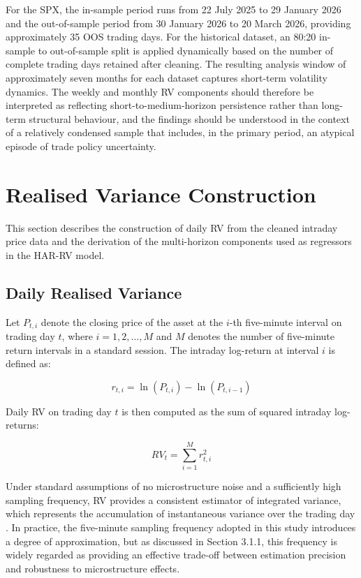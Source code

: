 \documentclass[12pt,a4paper]{report}
\begin{document}
For the SPX, the in-sample period runs from 22 July 2025 to 29 January 2026 and the out-of-sample period from 30 January 2026 to 20 March 2026, providing approximately 35 OOS trading days. For the historical dataset, an 80:20 in-sample to out-of-sample split is applied dynamically based on the number of complete trading days retained after cleaning. The resulting analysis window of approximately seven months for each dataset captures short-term volatility dynamics. The weekly and monthly RV components should therefore be interpreted as reflecting short-to-medium-horizon persistence rather than long-term structural behaviour, and the findings should be understood in the context of a relatively condensed sample that includes, in the primary period, an atypical episode of trade policy uncertainty.

\section{Realised Variance Construction}
This section describes the construction of daily RV from the cleaned intraday price data and the derivation of the multi-horizon components used as regressors in the HAR-RV model.

\subsection{Daily Realised Variance}
Let $P_{t,i}$ denote the closing price of the asset at the $i$-th five-minute interval on trading day $t$, where $i = 1, 2, \ldots, M$ and $M$ denotes the number of five-minute return intervals in a standard session. The intraday log-return at interval $i$ is defined as:

\begin{equation}
r_{t,i} = \ln(P_{t,i}) - \ln(P_{t,i-1})
\end{equation}

\noindent Daily RV on trading day $t$ is then computed as the sum of squared intraday log-returns:

\begin{equation}
RV_t = \sum_{i=1}^{M} r_{t,i}^2
\end{equation}

\noindent Under standard assumptions of no microstructure noise and a sufficiently high sampling frequency, RV provides a consistent estimator of integrated variance, which represents the accumulation of instantaneous variance over the trading day \citep{Andersen1998, BarndorffNielsen2002}. In practice, the five-minute sampling frequency adopted in this study introduces a degree of approximation, but as discussed in Section 3.1.1, this frequency is widely regarded as providing an effective trade-off between estimation precision and robustness to microstructure effects.
\end{document}
